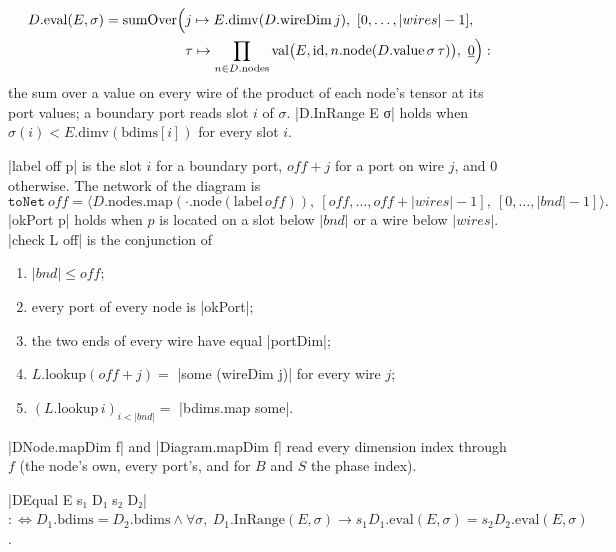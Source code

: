 \begin{definition}
\[\begin{aligned}
 D.\mathrm{eval}(E,\sigma)=\mathrm{sumOver}\Bigl(&j\mapsto E.\mathrm{dimv}(D.\mathrm{wireDim}\,j),\
 [0,\dots,|wires|-1],\\
 &\tau\mapsto\prod_{n\in D.\mathrm{nodes}}\mathrm{val}\bigl(E,\mathrm{id},n.\mathrm{node}(D.\mathrm{value}\,\sigma\,\tau)\bigr),\
 \underline0\Bigr):
\end{aligned}\]
the sum over a value on every wire of the product of each node's tensor at its port values; a
boundary port reads slot $i$ of $\sigma$. \lean|D.InRange E σ| holds when
$\sigma(i)<E.\mathrm{dimv}(\mathrm{bdims}[i])$ for every slot $i$.
\end{definition}

\begin{definition}
\lean|label off p| is the slot $i$ for a boundary port, $off+j$ for a port on wire $j$, and $0$
otherwise. The network of the diagram is
\[\mathtt{toNet}\ off=\bigl\langle D.\mathrm{nodes}.\mathrm{map}(\cdot.\mathrm{node}(\mathrm{label}\,off)),\
[off,\dots,off+|wires|-1],\ [0,\dots,|bnd|-1]\bigr\rangle.\]
\lean|okPort p| holds when $p$ is located on a
slot below $|bnd|$ or a wire below $|wires|$. \lean|check L off| is the conjunction of
\begin{enumerate}
\item $|bnd|\le off$;
\item every port of every node is \lean|okPort|;
\item the two ends of every wire have equal \lean|portDim|;
\item $L.\mathrm{lookup}(off+j)=$ \lean|some (wireDim j)| for every wire $j$;
\item $(L.\mathrm{lookup}\,i)_{i<|bnd|}=$ \lean|bdims.map some|.
\end{enumerate}
\end{definition}

\lean|DNode.mapDim f| and \lean|Diagram.mapDim f| read every dimension index through $f$ (the node's
own, every port's, and for $B$ and $S$ the phase index).

\begin{definition}[Diagram equality]
\lean|DEqual E s₁ D₁ s₂ D₂| $:\iff D_1.\mathrm{bdims}=D_2.\mathrm{bdims}\land\forall\sigma,\ D_1.\mathrm{InRange}(E,\sigma)\to
s_1D_1.\mathrm{eval}(E,\sigma)=s_2D_2.\mathrm{eval}(E,\sigma)$.
\end{definition}

